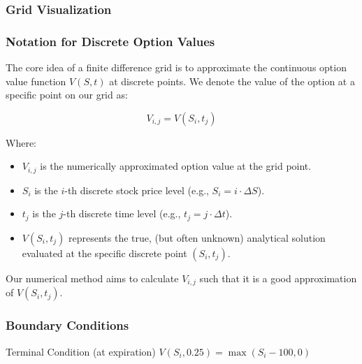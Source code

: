\documentclass[aspectratio=169]{beamer}
\begin{document}
\begin{frame}
\frametitle{Grid Visualization}
\begin{center}
\end{center}
\end{frame}

\begin{frame}
  \frametitle{Notation for Discrete Option Values}
  The core idea of a finite difference grid is to approximate the continuous option value function $V(S,t)$ at discrete points. We denote the value of the option at a specific point on our grid as:

  \[
    V_{i,j} = V(S_i, t_j)
  \]

  Where:
  \begin{itemize}
    \item $V_{i,j}$ is the numerically approximated option value at the grid point.
    \item $S_i$ is the $i$-th discrete stock price level (e.g., $S_i = i \cdot \Delta S$).
    \item $t_j$ is the $j$-th discrete time level (e.g., $t_j = j \cdot \Delta t$).
    \item $V(S_i, t_j)$ represents the true, (but often unknown) analytical solution evaluated at the specific discrete point $(S_i, t_j)$.
  \end{itemize}

\end{frame}

\begin{frame}
    Our numerical method aims to calculate $V_{i,j}$ such that it is a good approximation of $V(S_i, t_j)$.
\end{frame}

\begin{frame}
\frametitle{Boundary Conditions}
\begin{block}{Terminal Condition (at expiration)}
$V(S_i, 0.25) = \max(S_i - 100, 0)$
\end{block}


\end{frame}
\end{document}
